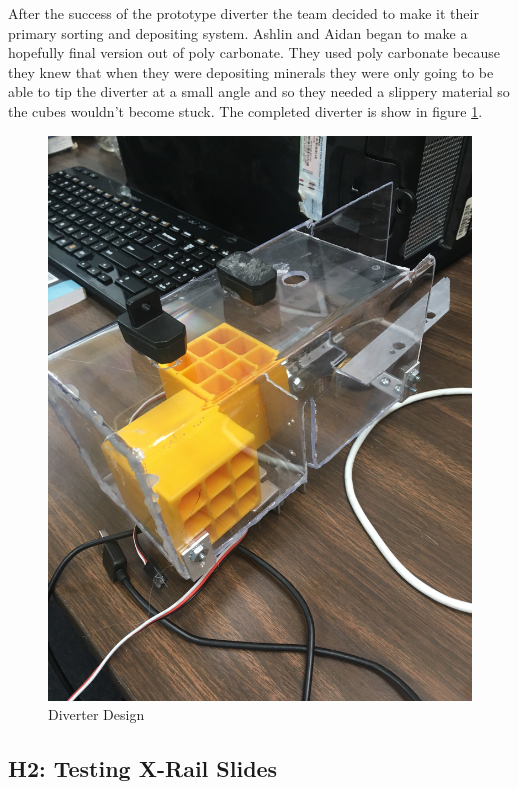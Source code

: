 \documentclass{article}
\begin{document}
After the success of the prototype diverter the team decided to make it their primary sorting and depositing system. Ashlin and Aidan began to make a hopefully final version out of poly carbonate. They used poly carbonate because they knew that when they were depositing minerals they were only going to be able to tip the diverter at a small angle and so they needed a slippery material so the cubes wouldn't become stuck. The completed diverter is show in figure  \ref{fig:diverter}.

\begin{figure}
    \centering
    \includegraphics[width=.6 \textwidth]{15_12-10/images/Diverter.jpg}
    \caption{Diverter Design}
    \label{fig:diverter}
\end{figure}

\subsection{H2: Testing X-Rail Slides}
\end{document}
